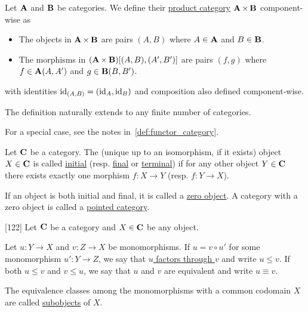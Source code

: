 \begin{definition}\label{def:product_category}\cite[exercise 1.1.14]{Leinster2014}
  Let $\operatorname{\mathbf{A}}$ and $\operatorname{\mathbf{B}}$ be categories. We define their \uline{product category} $\operatorname{\mathbf{A}} \times \operatorname{\mathbf{B}}$ component-wise as
  \begin{itemize}
    \item The objects in $\operatorname{\mathbf{A}} \times \operatorname{\mathbf{B}}$ are pairs $(A, B)$ where $A \in \operatorname{\mathbf{A}}$ and $B \in \operatorname{\mathbf{B}}$.
    \item The morphisms in $(\operatorname{\mathbf{A}} \times \operatorname{\mathbf{B}})[(A, B), (A', B')]$ are pairs $(f, g)$ where $f \in \operatorname{\mathbf{A}}(A, A')$ and $g \in \operatorname{\mathbf{B}}(B, B')$.
  \end{itemize}
  with identities $\operatorname{id}_{(A,B)} =(\operatorname{id}_A, \operatorname{id}_B)$ and composition also defined component-wise.

  The definition naturally extends to any finite number of categories.

  For a special case, see the notes in~\cref{def:functor_category}.
\end{definition}

\begin{definition}\label{def:initial_final_objects}\cite[definitions 2.1.7]{Leinster2014}
  Let $\operatorname{\mathbf{C}}$ be a category. The (unique up to an isomorphism, if it exists) object $X \in \operatorname{\mathbf{C}}$ is called \uline{initial} (resp. \uline{final} or \uline{terminal}) if for any other object $Y \in \operatorname{\mathbf{C}}$ there exists exactly one morphism $f: X \to Y$ (resp. $f: Y \to X$).

  If an object is both initial and final, it is called a \uline{zero object}. A category with a zero object is called a \uline{pointed category}.
\end{definition}

\begin{definition}\label{def:categorical_subobject}\cite{MacLane1994}[122]
  Let $\operatorname{\mathbf{C}}$ be a category and $X \in \operatorname{\mathbf{C}}$ be any object.

  Let $u: Y \to X$ and $v: Z \to X$ be monomorphisms. If $u = v \circ u'$ for some monomorphism $u': Y \to Z$, we say that \uline{$u$ factors through $v$} and write $u \leq v$. If both $u \leq v$ and $v \leq u$, we say that $u$ and $v$ are equivalent and write $u \equiv v$.

  The equivalence classes among the monomorphisms with a common codomain $X$ are called \uline{subobjects} of $X$.
\end{definition}
